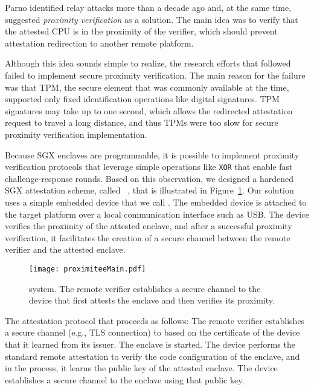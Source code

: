 Parno identified relay attacks more than a decade ago and, at the same time, suggested \emph{proximity verification} as a solution. The main idea was to verify that the attested CPU is in the proximity of the verifier, which should prevent attestation redirection to another remote platform. 

Although this idea sounds simple to realize, the research efforts that followed failed to implement secure proximity verification. The main reason for the failure was that TPM, the secure element that was commonly available at the time, supported only fixed identification operations like digital signatures. TPM signatures may take up to one second, which allows the redirected attestation request to travel a long distance, and thus TPMs were too slow for secure proximity verification implementation. %

Because SGX enclaves are programmable, it is possible to implement proximity verification protocols that leverage simple operations like \texttt{XOR} that enable fast challenge-response rounds. Based on this observation, we designed a hardened SGX attestation scheme, called \proximitee~\cite{proximitee}, that is illustrated in Figure~\ref{fig:proximitee}. Our solution uses a simple embedded device that we call \key. The embedded device is attached to the target platform over a local communication interface such as USB. The \key device verifies the proximity of the attested enclave, and after a successful proximity verification, it facilitates the creation of a secure channel between the remote verifier and the attested enclave. 

\begin{figure}[t]
 \centering
  \texttt{[image: proximiteeMain.pdf]}
 \caption{\proximitee system. The remote verifier establishes a secure channel to the \key device that first attests the enclave and then verifies its proximity.}
 \label{fig:proximitee}
\end{figure}

The \proximitee attestation protocol that proceeds as follows: \one The remote verifier establishes a secure channel (e.g., TLS connection) to \key based on the certificate of the device that it learned from its issuer. \two The enclave is started. \three The \key device performs the standard remote attestation to verify the code configuration of the enclave, and in the process, it learns the public key of the attested enclave. \four The \key device establishes a secure channel to the enclave using that public key. 

